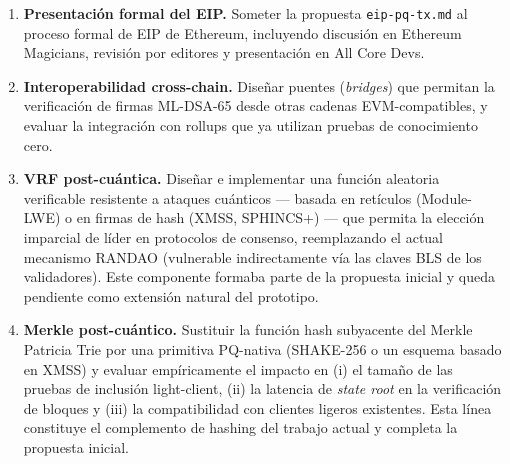 \begin{enumerate}
  \item \textbf{Presentación formal del EIP.} Someter la propuesta \texttt{eip-pq-tx.md} al proceso formal de EIP de Ethereum, incluyendo discusión en Ethereum Magicians, revisión por editores y presentación en All Core Devs.
  
  \item \textbf{Interoperabilidad cross-chain.} Diseñar puentes (\emph{bridges}) que permitan la verificación de firmas ML-DSA-65 desde otras cadenas EVM-compatibles, y evaluar la integración con rollups que ya utilizan pruebas de conocimiento cero.

  \item \textbf{VRF post-cuántica.} Diseñar e implementar una función aleatoria verificable resistente a ataques cuánticos --- basada en retículos (Module-LWE) o en firmas de hash (XMSS, SPHINCS+) --- que permita la elección imparcial de líder en protocolos de consenso, reemplazando el actual mecanismo RANDAO (vulnerable indirectamente vía las claves BLS de los validadores). Este componente formaba parte de la propuesta inicial y queda pendiente como extensión natural del prototipo.

  \item \textbf{Merkle post-cuántico.} Sustituir la función hash subyacente del Merkle Patricia Trie por una primitiva PQ-nativa (SHAKE-256 o un esquema basado en XMSS) y evaluar empíricamente el impacto en (i) el tamaño de las pruebas de inclusión light-client, (ii) la latencia de \emph{state root} en la verificación de bloques y (iii) la compatibilidad con clientes ligeros existentes. Esta línea constituye el complemento de hashing del trabajo actual y completa la propuesta inicial.
\end{enumerate}
